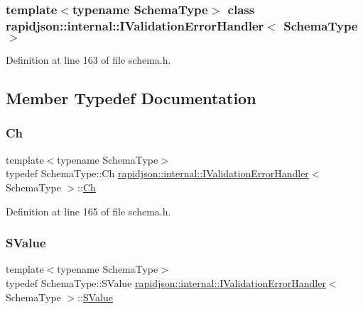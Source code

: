 \subsubsection*{template$<$typename Schema\+Type$>$\newline
class rapidjson\+::internal\+::\+I\+Validation\+Error\+Handler$<$ Schema\+Type $>$}



Definition at line 163 of file schema.\+h.



\subsection{Member Typedef Documentation}
\mbox{\label{classrapidjson_1_1internal_1_1_i_validation_error_handler_a02c672a313401138fd08504062f3d1d0}} 
\subsubsection{\texorpdfstring{Ch}{Ch}}
{\footnotesize\ttfamily template$<$typename Schema\+Type$>$ \\
typedef Schema\+Type\+::\+Ch \mbox{\hyperlink{classrapidjson_1_1internal_1_1_i_validation_error_handler}{rapidjson\+::internal\+::\+I\+Validation\+Error\+Handler}}$<$ Schema\+Type $>$\+::\mbox{\hyperlink{classrapidjson_1_1internal_1_1_i_validation_error_handler_a02c672a313401138fd08504062f3d1d0}{Ch}}}



Definition at line 165 of file schema.\+h.

\mbox{\label{classrapidjson_1_1internal_1_1_i_validation_error_handler_a8a2aaf7eb28a3ce7ed81689141f3af1f}} 
\subsubsection{\texorpdfstring{SValue}{SValue}}
{\footnotesize\ttfamily template$<$typename Schema\+Type$>$ \\
typedef Schema\+Type\+::\+S\+Value \mbox{\hyperlink{classrapidjson_1_1internal_1_1_i_validation_error_handler}{rapidjson\+::internal\+::\+I\+Validation\+Error\+Handler}}$<$ Schema\+Type $>$\+::\mbox{\hyperlink{classrapidjson_1_1internal_1_1_i_validation_error_handler_a8a2aaf7eb28a3ce7ed81689141f3af1f}{S\+Value}}}



